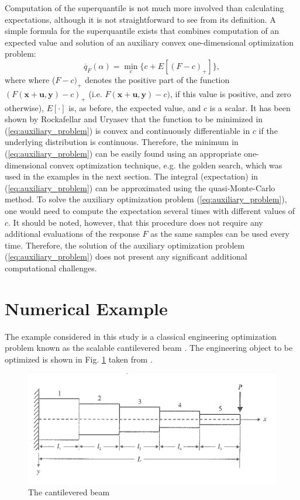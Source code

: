 \documentclass{llncs}
\begin{document}
Computation of the superquantile is not much more involved than calculating expectations, although it is not straightforward to see from its definition. A simple formula for the superquantile exists \cite{RockafellarUryasev2000,RockafellarRoyset2015} that combines computation of an expected value and solution of an auxiliary convex one-dimensional optimization problem:
    \begin{equation} \label{eq:auxiliary_problem}
			\overline{q}_F(\alpha) = \min_c\{c+E[(F-c)_+]\},
    \end{equation}
where where ($F-c)_+$ denotes the positive part of the function $(F(\pmb x+ \pmb u,\pmb y) - c)_+$ (i.e. $F(\pmb x+ \pmb u,\pmb y) - c)$, if this value is positive, and zero otherwise), $E[\cdot]$ is, as before, the expected value, and $c$ is a scalar. It has been shown by Rockafellar and Uryasev \cite{RockafellarUryasev2000} that the function to be minimized in (\ref{eq:auxiliary_problem}) is convex and continuously differentiable in $c$ if the underlying distribution is continuous. Therefore, the minimum in (\ref{eq:auxiliary_problem}) can be easily found using an appropriate one-dimensional convex optimization technique, e.g. the golden search, which was used in the examples in the next section. The integral (expectation) in (\ref{eq:auxiliary_problem}) can be approximated using the quasi-Monte-Carlo method. To solve the auxiliary optimization problem (\ref{eq:auxiliary_problem}), one would need to compute the expectation several times with different values of $c$. It should be noted, however, that this procedure does not require any additional evaluations of the response $F$ as the same samples can be used every time. Therefore, the solution of the auxiliary optimization problem (\ref{eq:auxiliary_problem}) does not present any significant additional computational challenges.

\section{Numerical Example}
\label{sec:num_example}

The example considered in this study is a classical engineering optimization problem known as the scalable cantilevered beam \cite{Vanderpllaats2001}. The engineering object to be optimized is shown in Fig. \ref{fig:beam} taken from \cite{Vanderpllaats2001}.

\begin{figure}[ht]
    \centering
    \includegraphics[width=1.0\textwidth]{beam.png}
    \caption{The cantilevered beam}
    \label{fig:beam}
\end{figure}
\end{document}
